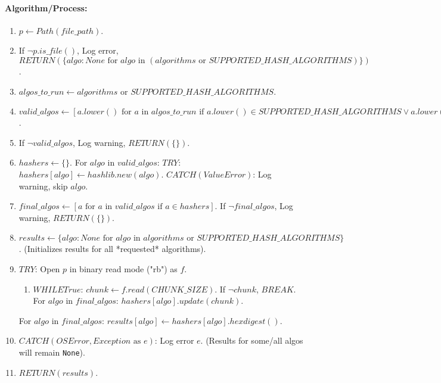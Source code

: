 \documentclass{article}
\begin{document}
\paragraph{Algorithm/Process:}
\begin{enumerate}
    \item $p \leftarrow Path(file\_path)$.
    \item If $\neg p.is\_file()$, Log error, $RETURN(\{algo: None \text{ for } algo \text{ in } (algorithms \text{ or } SUPPORTED\_HASH\_ALGORITHMS)\})$.
    \item $algos\_to\_run \leftarrow algorithms \text{ or } SUPPORTED\_HASH\_ALGORITHMS$.
    \item $valid\_algos \leftarrow [a.lower() \text{ for } a \text{ in } algos\_to\_run \text{ if } a.lower() \in SUPPORTED\_HASH\_ALGORITHMS \lor a.lower() \in hashlib.algorithms\_available]$.
    \item If $\neg valid\_algos$, Log warning, $RETURN(\{\})$.
    \item $hashers \leftarrow \{\}$. For $algo \text{ in } valid\_algos$: $TRY$: $hashers[algo] \leftarrow hashlib.new(algo)$. $CATCH (ValueError)$: Log warning, skip $algo$.
    \item $final\_algos \leftarrow [a \text{ for } a \text{ in } valid\_algos \text{ if } a \in hashers]$. If $\neg final\_algos$, Log warning, $RETURN(\{\})$.
    \item $results \leftarrow \{algo: None \text{ for } algo \text{ in } algorithms \text{ or } SUPPORTED\_HASH\_ALGORITHMS\}$. (Initializes results for all *requested* algorithms).
    \item $TRY$: Open $p$ in binary read mode ("rb") as $f$.
        \begin{enumerate}
            \item $WHILE True$: $chunk \leftarrow f.read(CHUNK\_SIZE)$. If $\neg chunk$, $BREAK$. For $algo \text{ in } final\_algos$: $hashers[algo].update(chunk)$.
        \end{enumerate}
        For $algo \text{ in } final\_algos$: $results[algo] \leftarrow hashers[algo].hexdigest()$.
    \item $CATCH (OSError, Exception \text{ as } e)$: Log error $e$. (Results for some/all algos will remain \texttt{None}).
    \item $RETURN(results)$.
\end{enumerate}
\end{document}
